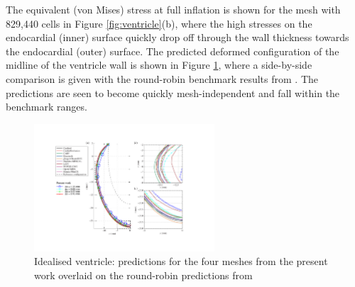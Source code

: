 \documentclass[sn-mathphys,Numbered]{sn-jnl}%
\begin{document}
The equivalent (von Mises) stress at full inflation is shown for the mesh with 829,440 cells in Figure \ref{fig:ventricle}(b), where the high stresses on the endocardial (inner) surface quickly drop off through the wall thickness towards the endocardial (outer) surface.
The predicted deformed configuration of the midline of the ventricle wall is shown in Figure \ref{fig:ventricle_accuracy}, where a side-by-side comparison is given with the round-robin benchmark results from \citet{Land2015}.
The predictions are seen to become quickly mesh-independent and fall within the benchmark ranges.
\begin{figure}[htbp]
	\centering
   		\includegraphics[width=0.6\textwidth]{figures/ventricle_results} 
	\caption{Idealised ventricle: predictions for the four meshes from the present work overlaid on the round-robin predictions from \citet{Land2015}}
	\label{fig:ventricle_accuracy}
\end{figure}
\end{document}

